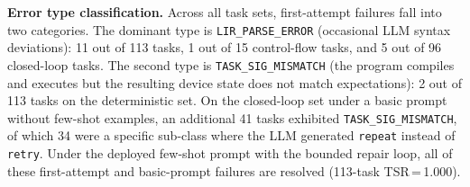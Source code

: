 \documentclass[a4paper,fleqn,longmktitle]{cas-dc}
\begin{document}
\noindent\textbf{Error type classification.}
Across all task sets, first-attempt failures fall into two categories. The dominant type is \texttt{LIR\_PARSE\_ERROR} (occasional LLM syntax deviations): 11 out of 113 tasks, 1 out of 15 control-flow tasks, and 5 out of 96 closed-loop tasks. The second type is \texttt{TASK\_SIG\_MISMATCH} (the program compiles and executes but the resulting device state does not match expectations): 2 out of 113 tasks on the deterministic set. On the closed-loop set under a basic prompt without few-shot examples, an additional 41 tasks exhibited \texttt{TASK\_SIG\_MISMATCH}, of which 34 were a specific sub-class where the LLM generated \texttt{repeat} instead of \texttt{retry}. Under the deployed few-shot prompt with the bounded repair loop, all of these first-attempt and basic-prompt failures are resolved (113-task TSR\,=\,1.000).

\begin{table}[t]
\centering
\caption{Multi-model comparison: generation results on 113 deterministic tasks and 600 random tasks (temperature,=,0.0). Random-600 TSR for deepseek-v4-pro is newly measured in this work; others are llama3.1:8b only.}
\label{tab:app_model_compare}
\footnotesize
{}
\end{table}
\end{document}
